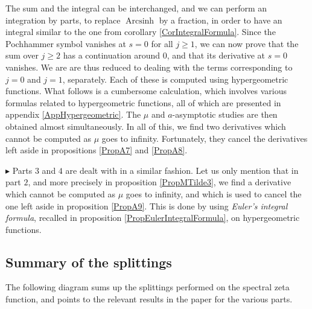 \documentclass{jams-l}
\theoremstyle{definition}
\theoremstyle{remark}
\numberwithin{equation}{section}
\DeclareMathOperator{\arcsinh}{Arcsinh}
\begin{document}
                \noindent The sum and the integral can be interchanged, and we can perform an integration by parts, to replace $\arcsinh$ by a fraction, in order to have an integral similar to the one from corollary \ref{CorIntegralFormula}. Since the Pochhammer symbol vanishes at $s=0$ for all $j \geqslant 1$, we can now prove that the sum over $j \geqslant 2$ has a continuation around $0$, and that its derivative at $s=0$ vanishes. We are are thus reduced to dealing with the terms corresponding to $j=0$ and $j=1$, separately. Each of these is computed using hypergeometric functions. What follows is a cumbersome calculation, which involves various formulas related to hypergeometric functions, all of which are presented in appendix \ref{AppHypergeometric}. The $\mu$ and $a$-asymptotic studies are then obtained almost simultaneously. In all of this, we find two derivatives which cannot be computed as $\mu$ goes to infinity. Fortunately, they cancel the derivatives left aside in propositions \ref{PropA7} and \ref{PropA8}.
            
            
            \medskip
            
            \hspace{30pt} $\blacktriangleright$ Parts $3$ and $4$ are dealt with in a similar fashion. Let us only mention that in part $2$, and more precisely in proposition \ref{PropMTilde3}, we find a derivative which cannot be computed as $\mu$ goes to infinity, and which is used to cancel the one left aside in proposition \ref{PropA9}. This is done by using \textit{Euler's integral formula}, recalled in proposition \ref{PropEulerIntegralFormula}, on hypergeometric functions.
        
        
        
    \subsection{Summary of the splittings}
    \label{SubSecDiagramSplittings}
    
        The following diagram sums up the splittings performed on the spectral zeta function, and points to the relevant results in the paper for the various parts.
        
\end{document}
